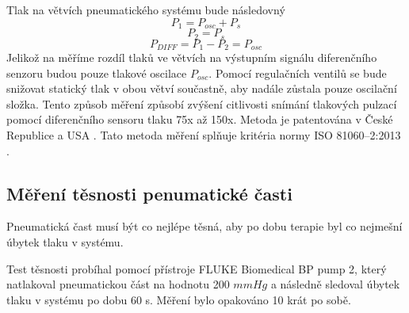 Tlak na větvích pneumatického systému bude následovný
\begin{equation*}
    P_1 = P_{osc} + P_s
\end{equation*}
\begin{equation*}
    P_2 = P_s
\end{equation*}
\begin{equation}
    P_{DIFF} = P_1 - P_2 = P_{osc}
\end{equation}
Jelikož na měříme rozdíl tlaků ve větvích na výstupním signálu diferenčního senzoru budou pouze tlakové oscilace $P_{osc}$.
Pomocí regulačních ventilů se bude snižovat statický tlak v obou větví součastně, aby nadále zůstala pouze oscilační složka.
Tento způsob měření způsobí zvýšení citlivosti snímání tlakových pulzací pomocí diferenčního sensoru tlaku 75x až 150x. \cite{cite:Habilitace}
Metoda je patentována v České Republice a USA \cite{cite:2}. Tato metoda měření splňuje kritéria normy ISO 81060–2:2013 \cite{cite:Validation}.
\pagebreak
\subsection{Měření těsnosti penumatické časti}
Pneumatická čast musí být co nejlépe těsná, aby po dobu terapie byl co nejmešní úbytek tlaku v systému.
\par
Test těsnosti probíhal pomocí přístroje FLUKE Biomedical BP pump 2, který natlakoval pneumatickou část na hodnotu 200 $mmHg$ a následně sledoval úbytek tlaku v systému po dobu 60 s.
Měření bylo opakováno 10 krát po sobě.

